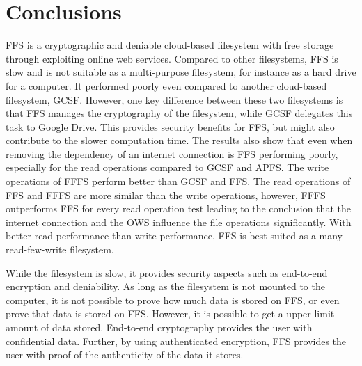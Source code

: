 
\section{Conclusions}
\label{sec:conclusions}
  


\gls{FFS} is a cryptographic and deniable \mbox{cloud-based} filesystem with free storage through exploiting online web services. Compared to other filesystems, \gls{FFS} is slow and is not suitable as a \mbox{multi-purpose} filesystem, for instance as a hard drive for a computer. It performed poorly even compared to another \mbox{cloud-based} filesystem, \gls{GCSF}. However, one key difference between these two filesystems is that \gls{FFS} manages the cryptography of the filesystem, while \gls{GCSF} delegates this task to Google Drive. This provides security benefits for \gls{FFS}, but might also contribute to the slower computation time. The results also show that even when removing the dependency of an internet connection is \gls{FFS} performing poorly, especially for the read operations compared to \gls{GCSF} and \gls{APFS}. The write operations of \gls{FFFS} perform better than \gls{GCSF} and \gls{FFS}. The read operations of \gls{FFS} and \gls{FFFS} are more similar than the write operations, however, \gls{FFFS} outperforms \gls{FFS} for every read operation test leading to the conclusion that the internet connection and the \gls{OWS} influence the file operations significantly. With better read performance than write performance, \gls{FFS} is best suited as a \mbox{many-read-few-write} filesystem.

While the filesystem is slow, it provides security aspects such as \mbox{end-to-end} encryption and deniability. As long as the filesystem is not mounted to the computer, it is not possible to prove how much data is stored on \gls{FFS}, or even prove that data is stored on \gls{FFS}. However, it is possible to get a upper-limit amount of data stored. \mbox{End-to-end} cryptography provides the user with confidential data. Further, by using authenticated encryption, \gls{FFS} provides the user with proof of the authenticity of the data it stores. 

